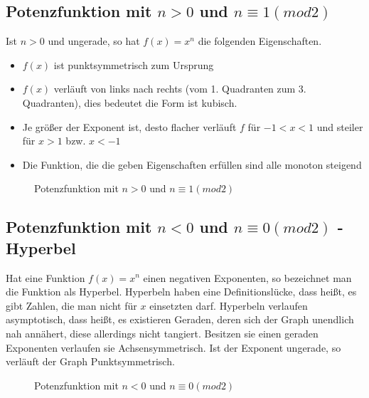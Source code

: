 \subsection{Potenzfunktion mit $n>0$ und $ n\equiv1(mod2)$}
Ist $n>0$ und ungerade, so hat $f(x)=x^n$ die folgenden Eigenschaften.
\begin{itemize}
	\item $f(x)$ ist punktsymmetrisch zum Ursprung
	\item $f(x)$ verläuft von links nach rechts (vom 1. Quadranten zum 3. Quadranten), dies bedeutet die Form ist kubisch. %
	\item Je größer der Exponent ist, desto flacher verläuft $f$ für $-1<x<1$ und steiler für $x>1$ bzw. $x<-1$
	\item Die Funktion, die die geben Eigenschaften erfüllen sind alle monoton steigend
\end{itemize}
\begin{figure}[h!]
\centering
{}
\caption{Potenzfunktion mit $n>0$ und $ n\equiv1(mod2)$}
\end{figure}
\subsection{Potenzfunktion mit $n<0$ und $ n\equiv0(mod2)$ - Hyperbel}
Hat eine Funktion $f(x)=x^n$ einen negativen Exponenten, so bezeichnet man die Funktion als Hyperbel. Hyperbeln haben eine Definitionslücke, dass heißt, es gibt Zahlen, die man nicht für $x$ einsetzten darf. Hyperbeln verlaufen asymptotisch, dass heißt, es existieren Geraden, deren sich der Graph unendlich nah annähert, diese allerdings nicht tangiert. Besitzen sie einen geraden Exponenten verlaufen sie Achsensymmetrisch. Ist der Exponent ungerade, so verläuft der Graph Punktsymmetrisch. 
\begin{figure}[h!]
\centering
{}
\caption{Potenzfunktion mit $n<0$ und $ n\equiv0(mod2)$}
\label{}
\end{figure}

